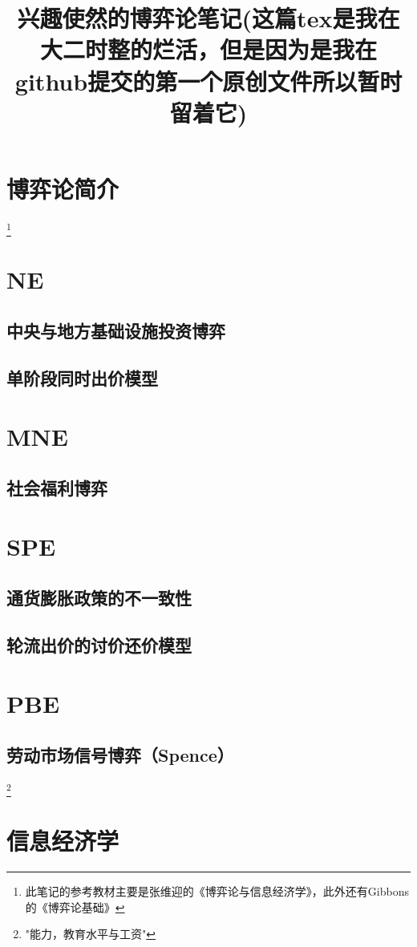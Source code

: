 \documentclass{article}
\begin{document}
\title{兴趣使然的博弈论笔记(这篇tex是我在大二时整的烂活，但是因为是我在github提交的第一个原创文件所以暂时留着它)}
\maketitle
\tableofcontents
\section{博弈论简介} \footnote{此笔记的参考教材主要是张维迎的《博弈论与信息经济学》，此外还有Gibbons的《博弈论基础》}
\section{NE}
\subsection{中央与地方基础设施投资博弈}
\subsection{单阶段同时出价模型}
\section{MNE}
\subsection{社会福利博弈}
\section{SPE}
\subsection{通货膨胀政策的不一致性}
\subsection{轮流出价的讨价还价模型}
\section{PBE}
\subsection{劳动市场信号博弈（Spence）}\footnote{"能力，教育水平与工资"}
\section{信息经济学}
\end{document}
